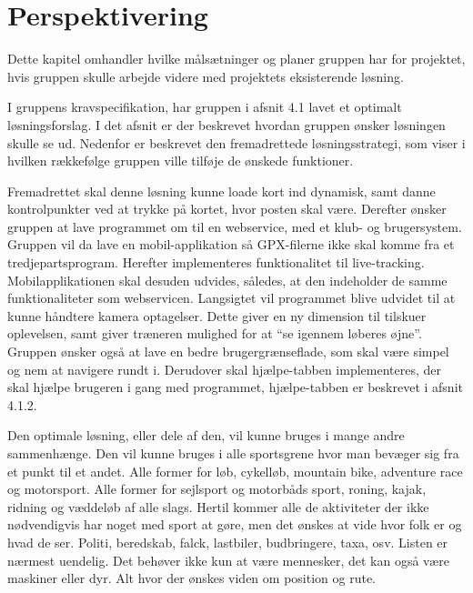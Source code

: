 \chapter{Perspektivering}
Dette kapitel omhandler hvilke målsætninger og planer gruppen har for projektet, hvis gruppen skulle arbejde videre med projektets eksisterende løsning.

I gruppens kravspecifikation, har gruppen i afsnit 4.1 lavet et optimalt løsningsforslag. I det afsnit er der beskrevet hvordan gruppen ønsker løsningen skulle se ud. Nedenfor er beskrevet den fremadrettede løsningsstrategi, som viser i hvilken rækkefølge gruppen ville tilføje de ønskede funktioner.

Fremadrettet skal denne løsning kunne loade kort ind dynamisk, samt danne kontrolpunkter ved at trykke på kortet, hvor posten skal være. Derefter ønsker gruppen at lave programmet om til en webservice, med et klub- og brugersystem. \newline
Gruppen vil da lave en mobil-applikation så GPX-filerne ikke skal komme fra et tredjepartsprogram. Herefter implementeres funktionalitet til live-tracking.  Mobilapplikationen skal desuden udvides, således, at den indeholder de samme funktionaliteter som webservicen. Langsigtet vil programmet blive udvidet til at kunne håndtere kamera optagelser. Dette giver en ny dimension til tilskuer oplevelsen, samt giver træneren mulighed for at “se igennem løberes øjne”. \newline
Gruppen ønsker også at lave en bedre brugergrænseflade, som skal være simpel og nem at navigere rundt i. Derudover skal hjælpe-tabben implementeres, der skal hjælpe brugeren i gang med programmet, hjælpe-tabben er beskrevet i afsnit 4.1.2. 

Den optimale løsning, eller dele af den, vil kunne bruges i mange andre sammenhænge. Den vil kunne bruges i alle sportsgrene hvor man bevæger sig fra et punkt til et andet. Alle former for løb, cykelløb, mountain bike, adventure race og motorsport.  Alle former for sejlsport og motorbåds sport, roning, kajak, ridning og væddeløb af alle slags. Hertil kommer alle de aktiviteter der ikke nødvendigvis har noget med sport at gøre, men det ønskes at vide hvor folk er og hvad de ser. Politi, beredskab, falck, lastbiler, budbringere, taxa, osv. Listen er nærmest uendelig. Det behøver ikke kun at være mennesker, det kan også være maskiner eller dyr. Alt hvor der ønskes viden om position og rute.